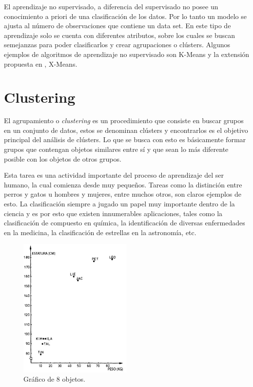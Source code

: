 El aprendizaje no supervisado, a diferencia del supervisado no posee un conocimiento a priori de una clasificación de los datos. Por lo tanto un modelo se ajusta al número de observaciones que contiene un data set. En este tipo de aprendizaje solo se cuenta con diferentes atributos, sobre los cuales se buscan semejanzas para poder clasificarlos y crear agrupaciones o clústers. Algunos ejemplos de algoritmos de aprendizaje no supervisado son K-Means y la extensión propuesta en \cite{Pelleg00x-means:extending}, X-Means.

\section{Clustering}

El agrupamiento o \textit{clustering} \cite{clusteranalysis} es un procedimiento que consiste en buscar grupos en un conjunto de datos, estos se denominan clústers y encontrarlos es el objetivo principal del análisis de clústers. Lo que se busca con esto es básicamente formar grupos que contengan objetos similares entre sí y que sean lo más diferente posible con los objetos de otros grupos.

Esta tarea es una actividad importante del proceso de aprendizaje del ser humano, la cual comienza desde muy pequeños. Tareas como la distinción entre perros y gatos u hombres y mujeres, entre muchos otros, son claros ejemplos de esto. La clasificación siempre a jugado un papel muy importante dentro de la ciencia y es por esto que existen innumerables aplicaciones, tales como la clasificación de compuesto en química, la identificación de diversas enfermedades en la medicina, la clasificación de estrellas en la astronomía, etc.

\begin{figure}[H]
    \centering
    \includegraphics[width=0.5\textwidth]{images/clustering_example.jpg}
    \caption{Gráfico de 8 objetos. \cite{clusteranalysis}}
    \label{fig:clustering_example}
\end{figure}

